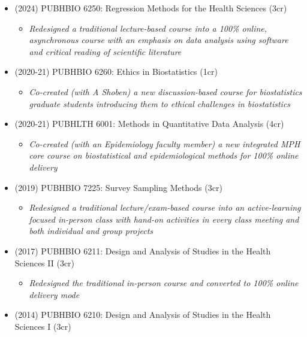 \documentclass[
  english,
  letterpaper,
  DIV=11,
  numbers=noendperiod]{scrartcl}
\providecommand{\tightlist}{%
  \setlength{\itemsep}{0pt}\setlength{\parskip}{0pt}}
\begin{document}
\begin{itemize}
\tightlist
\item
  (2024) PUBHBIO 6250: Regression Methods for the Health Sciences (3cr)

  \begin{itemize}
  \tightlist
  \item
    \emph{Redesigned a traditional lecture-based course into a 100\%
    online, asynchronous course with an emphasis on data analysis using
    software and critical reading of scientific literature}
  \end{itemize}
\item
  (2020-21) PUBHBIO 6260: Ethics in Biostatistics (1cr)

  \begin{itemize}
  \tightlist
  \item
    \emph{Co-created (with A Shoben) a new discussion-based course for
    biostatistics graduate students introducing them to ethical
    challenges in biostatistics}
  \end{itemize}
\item
  (2020-21) PUBHLTH 6001: Methods in Quantitative Data Analysis (4cr)

  \begin{itemize}
  \tightlist
  \item
    \emph{Co-created (with an Epidemiology faculty member) a new
    integrated MPH core course on biostatistical and epidemiological
    methods for 100\% online delivery}
  \end{itemize}
\item
  (2019) PUBHBIO 7225: Survey Sampling Methods (3cr)

  \begin{itemize}
  \tightlist
  \item
    \emph{Redesigned a traditional lecture/exam-based course into an
    active-learning focused in-person class with hand-on activities in
    every class meeting and both individual and group projects}
  \end{itemize}
\item
  (2017) PUBHBIO 6211: Design and Analysis of Studies in the Health
  Sciences II (3cr)

  \begin{itemize}
  \tightlist
  \item
    \emph{Redesigned the traditional in-person course and converted to
    100\% online delivery mode}
  \end{itemize}
\item
  (2014) PUBHBIO 6210: Design and Analysis of Studies in the Health
  Sciences I (3cr)


\end{itemize}
\end{document}
